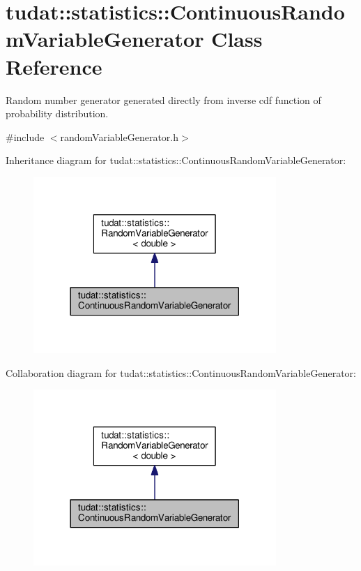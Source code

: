 \hypertarget{classtudat_1_1statistics_1_1ContinuousRandomVariableGenerator}{}\section{tudat\+:\+:statistics\+:\+:Continuous\+Random\+Variable\+Generator Class Reference}
\label{classtudat_1_1statistics_1_1ContinuousRandomVariableGenerator}


Random number generator generated directly from inverse cdf function of probability distribution.  




{\ttfamily \#include $<$random\+Variable\+Generator.\+h$>$}



Inheritance diagram for tudat\+:\+:statistics\+:\+:Continuous\+Random\+Variable\+Generator\+:
\nopagebreak
\begin{figure}[H]
\begin{center}
\leavevmode
\includegraphics[width=261pt]{classtudat_1_1statistics_1_1ContinuousRandomVariableGenerator__inherit__graph}
\end{center}
\end{figure}


Collaboration diagram for tudat\+:\+:statistics\+:\+:Continuous\+Random\+Variable\+Generator\+:
\nopagebreak
\begin{figure}[H]
\begin{center}
\leavevmode
\includegraphics[width=261pt]{classtudat_1_1statistics_1_1ContinuousRandomVariableGenerator__coll__graph}
\end{center}
\end{figure}
